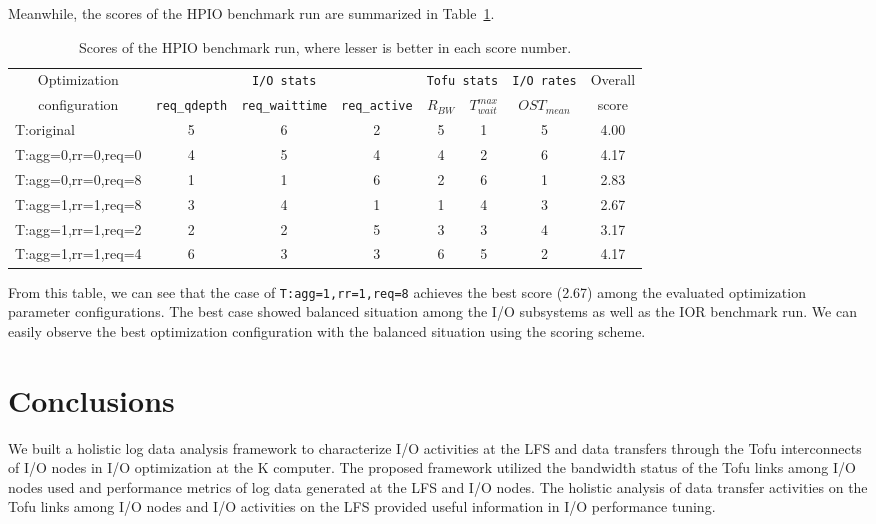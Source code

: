\documentclass{jhps}
\begin{document}
Meanwhile, the scores of the HPIO benchmark run are summarized in
Table~\ref{tbl:HPIO_OVERALL_EVAL}.
%
\begin{table}[tb]
\caption{Scores of the HPIO benchmark run, where lesser is better in each score number.}
\centering
\begin{tabular}{lccccccc}
\hline
\multicolumn{1}{c}{Optimization}  & \multicolumn{3}{c}{{\tt I/O stats}} & \multicolumn{2}{c}{{\tt Tofu stats}} & {\tt I/O rates} & Overall \\
\multicolumn{1}{c}{configuration} & {\tt req\_qdepth} & {\tt req\_waittime} & {\tt req\_active} &  $R_{BW}$ & $T_{wait}^{max}$ & $OST_{mean}$ & score \\
\hline
T:original         & 5 & 6 & 2 & 5 & 1 & 5 & 4.00 \\
T:agg=0,rr=0,req=0 & 4 & 5 & 4 & 4 & 2 & 6 & 4.17 \\
T:agg=0,rr=0,req=8 & 1 & 1 & 6 & 2 & 6 & 1 & 2.83 \\
T:agg=1,rr=1,req=8 & 3 & 4 & 1 & 1 & 4 & 3 & 2.67 \\
T:agg=1,rr=1,req=2 & 2 & 2 & 5 & 3 & 3 & 4 & 3.17 \\
T:agg=1,rr=1,req=4 & 6 & 3 & 3 & 6 & 5 & 2 & 4.17 \\
\hline
\end{tabular}
\label{tbl:HPIO_OVERALL_EVAL}
\end{table}
%
From this table, we can see that the case of {\tt T:agg=1,rr=1,req=8}
achieves the best score (2.67) among the evaluated optimization parameter configurations.
The best case showed balanced situation among the I/O subsystems
as well as the IOR benchmark run.
We can easily observe the best optimization configuration with
the balanced situation using the scoring scheme.

\section{Conclusions}
\label{sec:CONCLUSIONS}

We built a holistic log data analysis framework to characterize I/O activities
at the LFS and data transfers through the Tofu interconnects of I/O nodes
in I/O optimization at the K computer.
The proposed framework utilized the bandwidth status of the Tofu links
among I/O nodes used and performance metrics of log data generated at the LFS
and I/O nodes.
The holistic analysis of data transfer activities on the Tofu links among I/O nodes
and I/O activities on the LFS provided useful information in I/O performance tuning.
\end{document}
